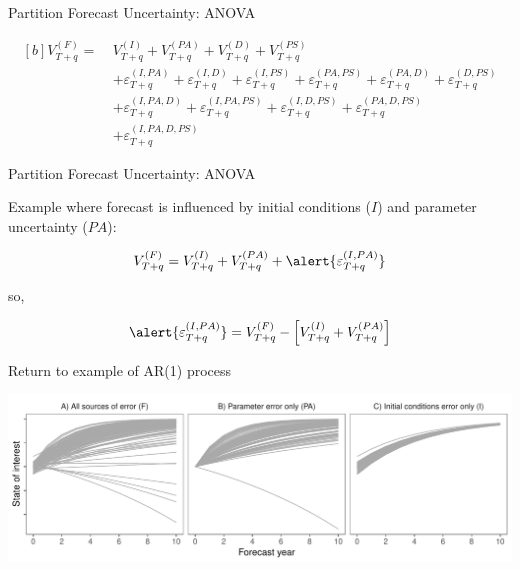 \documentclass[12pt, compress, aspectratio=1610]{beamer}
\begin{document}
\begin{frame}{%
\protect\hypertarget{partition-forecast-uncertainty-anova-1}{%
Partition Forecast Uncertainty: ANOVA}}

\begin{equation*}
\begin{aligned}[b]
V_{T+q}^{(F)} = \ &V_{T+q}^{(I)} + V_{T+q}^{(PA)} + V_{T+q}^{(D)} + V_{T+q}^{(PS)} \\
&+ \varepsilon_{T+q}^{(I,PA)} + \varepsilon_{T+q}^{(I,D)} + \varepsilon_{T+q}^{(I,PS)} + \varepsilon_{T+q}^{(PA,PS)} + \varepsilon_{T+q}^{(PA,D)} + \varepsilon_{T+q}^{(D,PS)} \\
&+ \varepsilon_{T+q}^{(I,PA,D)} + \varepsilon_{T+q}^{(I,PA,PS)} + \varepsilon_{T+q}^{(I,D,PS)} + \varepsilon_{T+q}^{(PA,D,PS)} \\
&+ \varepsilon_{T+q}^{(I,PA,D,PS)}
\end{aligned}
\end{equation*}

\end{frame}

\begin{frame}{%
\protect\hypertarget{partition-forecast-uncertainty-anova-2}{%
Partition Forecast Uncertainty: ANOVA}}

Example where forecast is influenced by initial conditions (\(I\)) and
parameter uncertainty (\(PA\)):

\begin{equation*}
V^{(F)}_{T+q} = V^{(I)}_{T+q} + V^{(PA)}_{T+q} + \alert{\varepsilon_{T+q}^{(I,PA)}}
\end{equation*}

so,

\begin{equation*}
\alert{\varepsilon_{T+q}^{(I,PA)}} = V^{(F)}_{T+q} - \left[ V^{(I)}_{T+q} + V^{(PA)}_{T+q} \right]
\end{equation*}

\end{frame}

\begin{frame}{%
\protect\hypertarget{return-to-example-of-ar1-process}{%
Return to example of AR(1) process}}

\centering

\includegraphics[width=\textwidth]{./figures/forecast_uncertainty_example2.pdf}

\end{frame}
\end{document}
